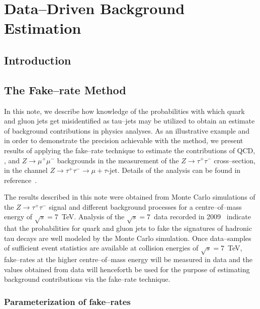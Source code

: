 \ifx\master\undefined\fi

\newcommand{\tablesize}{\small}

\chapter{Data--Driven Background Estimation}
\label{ch:backgrounds}

\section{Introduction}

\section{The Fake--rate Method}

In this note, we describe how knowledge of the probabilities with which quark
and gluon jets get misidentified as tau--jets may be utilized to obtain an
estimate of background contributions in physics analyses.  As an illustrative
example and in order to demonstrate the precision achievable with the method, we
present results of applying the fake--rate technique to estimate the
contributions of QCD, \WpJets, \ttbarpJets and $Z \rightarrow \mu^{+}
\mu^{-}$ backgrounds in the measurement of the $Z \rightarrow \tau^{+} \tau^{-}$
cross--section, in the channel $Z \rightarrow \tau^{+} \tau^{-} \rightarrow \mu
+ \tau\mbox{-jet}$.  Details of the analysis can be found in
reference~\cite{EWKtauNote}.

The results described in this note were obtained from Monte Carlo simulations of
the $Z \rightarrow \tau^{+} \tau^{-}$ signal and different background processes
for a centre--of--mass energy of $\sqrt{s} = 7$~TeV.  Analysis of the $\sqrt{s}
= 7$~\TeV data recorded in 2009~\cite{refFakeRate2009dataResults} indicate that
the probabilities for quark and gluon jets to fake the signatures of hadronic
tau decays are well modeled by the Monte Carlo simulation.  Once data--samples
of sufficient event statistics are available at collision energies of $\sqrt{s}
= 7$~TeV, fake--rates at the higher centre--of--mass energy will be measured in
data and the values obtained from data will henceforth be used for the purpose
of estimating background contributions via the fake--rate technique.

\subsection{Parameterization of fake--rates}

